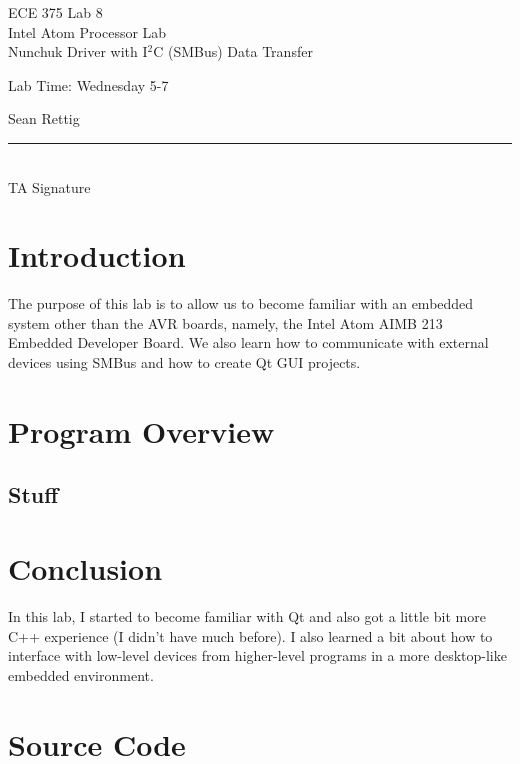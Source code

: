 \documentclass[12pt,letterpaper]{article}
\begin{document}
\begin{titlepage}
    \vspace*{4cm}
    \begin{flushright}
    {\huge
        ECE 375 Lab 8\\[1cm]
    }
    {\large
        Intel Atom Processor Lab\\
        Nunchuk Driver with I$^{2}$C (SMBus) Data Transfer
    }
    \end{flushright}
    \begin{flushleft}
    Lab Time: Wednesday 5-7
    \end{flushleft}
    \begin{flushright}
    Sean Rettig
    \vfill
    \rule{5in}{.5mm}\\
    TA Signature
    \end{flushright}

\end{titlepage}

\section{Introduction}

The purpose of this lab is to allow us to become familiar with an embedded
system other than the AVR boards, namely, the Intel Atom AIMB 213 Embedded
Developer Board.  We also learn how to communicate with external devices using
SMBus and how to create Qt GUI projects.

\section{Program Overview}

\subsection{Stuff}


\section{Conclusion}

In this lab, I started to become familiar with Qt and also got a little bit more C++ experience (I didn't have much before).  I also learned a bit about how to interface with low-level devices from higher-level programs in a more desktop-like embedded environment.

\section{Source Code}

\begin{verbatim}
\end{verbatim}
\end{document}
